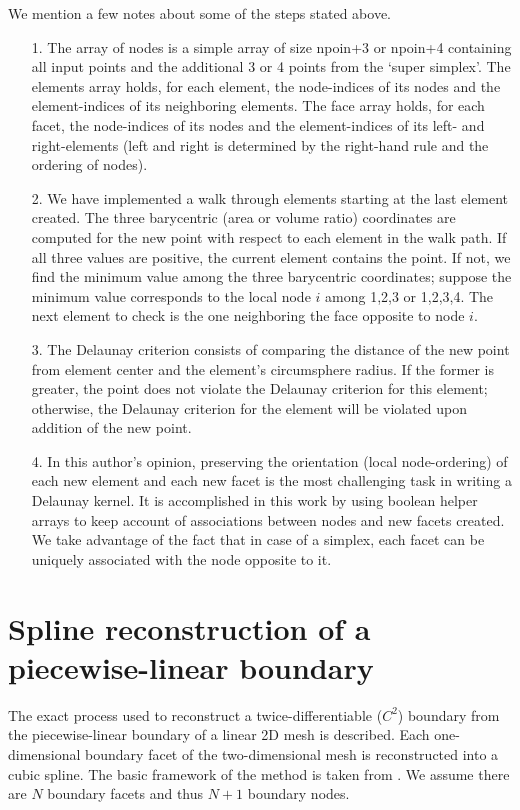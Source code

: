We mention a few notes about some of the steps stated above.
\begin{enumerate}
	\item[1.] The array of nodes is a simple array of size npoin+3 or npoin+4 containing all input points and the additional 3 or 4 points from the `super simplex'. The elements array holds, for each element, the node-indices of its nodes and the element-indices of its neighboring elements. The face array holds, for each facet, the node-indices of its nodes and the element-indices of its left- and right-elements (left and right is determined by the right-hand rule and the ordering of nodes).
	\item[2.] We have implemented a walk through elements starting at the last element created. The three barycentric (area or volume ratio) coordinates are computed for the new point with respect to each element in the walk path. If all three values are positive, the current element contains the point. If not, we find the minimum value among the three barycentric coordinates; suppose the minimum value corresponds to the local node $i$ among 1,2,3 or 1,2,3,4. The next element to check is the one neighboring the face opposite to node $i$.
	\item[3.] The Delaunay criterion consists of comparing the distance of the new point from element center and the element's circumsphere radius. If the former is greater, the point does not violate the Delaunay criterion for this element; otherwise, the Delaunay criterion for the element will be violated upon addition of the new point.
	\item[4.] In this author's opinion, preserving the orientation (local node-ordering) of each new element and each new facet is the most challenging task in writing a Delaunay kernel. It is accomplished in this work by using boolean helper arrays to keep account of associations between nodes and new facets created. We take advantage of the fact that in case of a simplex, each facet can be uniquely associated with the node opposite to it.
\end{enumerate}

\chapter[Spline reconstruction]{Spline reconstruction of a piecewise-linear boundary}
\label{app:spline}

The exact process used to reconstruct a twice-differentiable ($C^2$) boundary from the piecewise-linear boundary of a linear 2D mesh is described. Each one-dimensional boundary facet of the two-dimensional mesh is reconstructed into a cubic spline. The basic framework of the method is taken from \cite{sr:wolframspline}. We assume there are $N$ boundary facets and thus $N+1$ boundary nodes.

